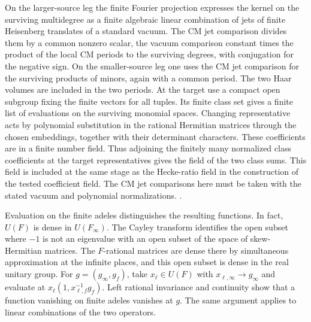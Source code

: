 On the larger-source leg the finite Fourier projection expresses
the kernel on the surviving multidegree as a finite algebraic
linear combination of jets of finite Heisenberg translates of a
standard vacuum. The CM jet comparison divides them by a common
nonzero scalar, the vacuum comparison constant times the product
of the local CM periods to the surviving degrees, with conjugation
for the negative sign. On the smaller-source leg one uses the
CM jet comparison for the surviving products of minors, again with
a common period. The two Haar volumes are included in the two
periods. At the target use a compact open subgroup fixing the
finite vectors for all tuples. Its finite class set gives a finite
list of evaluations on the surviving monomial spaces. Changing
representative acts by polynomial substitution in the rational
Hermitian matrices through the chosen embeddings, together with
their determinant characters. These coefficients are in a finite
number field. Thus adjoining the finitely many normalized class
coefficients at the target representatives gives the field of the
two class sums. This field is included at the same stage as the
Hecke-ratio field in the construction of the tested coefficient
field. The CM jet comparisons here must be taken with the stated
vacuum and polynomial normalizations.
.

Evaluation on the finite adeles distinguishes the resulting
functions. In fact, \(U(F)\) is dense in \(U(F_\infty)\).
The Cayley transform identifies the open subset where \(-1\) is
not an eigenvalue with an open subset of the space of
skew-Hermitian matrices. The \(F\)-rational matrices are dense
there by simultaneous approximation at the infinite places,
and this open subset is dense in the real unitary group.
For \(g=(g_\infty,g_f)\), take \(x_\ell\in U(F)\) with
\(x_{\ell,\infty}\to g_\infty\) and evaluate at
\(x_\ell(1,x_{\ell,f}^{-1}g_f)\). Left rational invariance and
continuity show that a function vanishing on finite adeles vanishes
at \(g\). The same argument applies to linear combinations of the
two operators.

